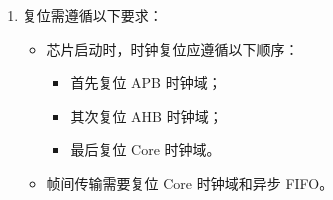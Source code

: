 \documentclass[main\_\_CN.tex]{subfiles}
\begin{document}
\begin{enumerate}
    RX 模块中的具体操作步骤为：
    \begin{itemize}
        \item 清除 \hyperref[fielddesc:PCRPARLCLKRXEN]{PCR\_PARL\_CLK\_RX\_EN} 关闭 RX Core 时钟域；
        \item 向 \hyperref[fielddesc:PARLIORXSTART]{PARL\_IO\_RX\_START} 写 1；
        \item 置位 \hyperref[fielddesc:PCRPARLCLKRXEN]{PCR\_PARL\_CLK\_RX\_EN} 打开 RX Core 时钟域；
        \item 操作外部设备，使其开始发送数据；
        \item 清除 \hyperref[fielddesc:PCRPARLCLKRXEN]{PCR\_PARL\_CLK\_RX\_EN} 关闭 RX Core 时钟域；
        \item 向 \hyperref[fielddesc:PARLIOTXSTART]{PARL\_IO\_TX\_START} 写 0。
    \end{itemize}
    TX 模块中的具体操作步骤为：
    \begin{itemize}
        \item 清除 \hyperref[fielddesc:PCRPARLCLKTXEN]{PCR\_PARL\_CLK\_TX\_EN} 关闭 TX Core 时钟域；
        \item 向 \hyperref[fielddesc:PARLIOTXSTART]{PARL\_IO\_TX\_START} 写 1；
        \item 置位 \hyperref[fielddesc:PCRPARLCLKTXEN]{PCR\_PARL\_CLK\_TX\_EN} 打开 TX Core 时钟域；
        \item 操作外部设备，使其开始接收数据；
        \item 清除 \hyperref[fielddesc:PCRPARLCLKTXEN]{PCR\_PARL\_CLK\_TX\_EN} 关闭 TX Core 时钟域；
        \item 向 \hyperref[fielddesc:PARLIOTXSTART]{PARL\_IO\_TX\_START} 写 0。
    \end{itemize}
    
    \item 复位需遵循以下要求：
    \begin{itemize}
        \item 芯片启动时，时钟复位应遵循以下顺序：
        \begin{itemize}
            \item 首先复位 APB 时钟域；
            \item 其次复位 AHB 时钟域；
            \item 最后复位 Core 时钟域。
        \end{itemize}
        \item 帧间传输需要复位 Core 时钟域和异步 FIFO。
    \end{itemize}
\end{enumerate}
\end{document}
